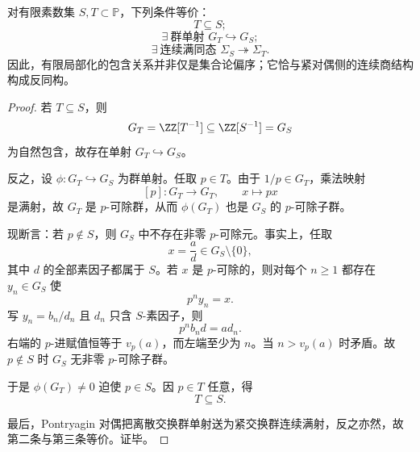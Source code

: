 \begin{theorem}[有限局部化格与紧对偶商格的反同构]\label{thm:xi-time-part9zg-finite-localization-dual-quotient-lattice}
对有限素数集 \(S,T\subset\mathbb P\)，下列条件等价：
\[
T\subseteq S;
\]
\[
\exists\ \text{群单射 }G_T\hookrightarrow G_S;
\]
\[
\exists\ \text{连续满同态 }\Sigma_S\twoheadrightarrow \Sigma_T.
\]
因此，有限局部化的包含关系并非仅是集合论偏序；它恰与紧对偶侧的连续商结构构成反同构。
\end{theorem}
\begin{proof}
若 \(T\subseteq S\)，则
\[
G_T=\ZZ[T^{-1}]\subseteq \ZZ[S^{-1}]=G_S
\]
为自然包含，故存在单射 \(G_T\hookrightarrow G_S\)。

反之，设 \(\phi:G_T\hookrightarrow G_S\) 为群单射。任取 \(p\in T\)。由于 \(1/p\in G_T\)，乘法映射
\[
[p]:G_T\to G_T,\qquad x\mapsto px
\]
是满射，故 \(G_T\) 是 \(p\)-可除群，从而 \(\phi(G_T)\) 也是 \(G_S\) 的 \(p\)-可除子群。

现断言：若 \(p\notin S\)，则 \(G_S\) 中不存在非零 \(p\)-可除元。事实上，任取
\[
x=\frac{a}{d}\in G_S\setminus\{0\},
\]
其中 \(d\) 的全部素因子都属于 \(S\)。若 \(x\) 是 \(p\)-可除的，则对每个 \(n\ge 1\) 都存在 \(y_n\in G_S\) 使
\[
p^ny_n=x.
\]
写 \(y_n=b_n/d_n\) 且 \(d_n\) 只含 \(S\)-素因子，则
\[
p^n b_n d=a d_n.
\]
右端的 \(p\)-进赋值恒等于 \(v_p(a)\)，而左端至少为 \(n\)。当 \(n>v_p(a)\) 时矛盾。故 \(p\notin S\) 时 \(G_S\) 无非零 \(p\)-可除子群。

于是 \(\phi(G_T)\neq 0\) 迫使 \(p\in S\)。因 \(p\in T\) 任意，得
\[
T\subseteq S.
\]

最后，Pontryagin 对偶把离散交换群单射送为紧交换群连续满射，反之亦然，故第二条与第三条等价。证毕。
\end{proof}

